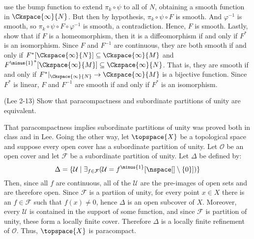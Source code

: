 \documentclass{article}                                                        %
\begin{document}
\begin{solution}
            use the bump function to extend $\pi_{k}\circ\psi$ to all of $N$,
            obtaining a smooth function in $\Ckspace{\infty}{N}$. But then by
            hypothesis, $\pi_{k}\circ\psi\circ{F}$ is smooth. And
            $\varphi^{\minus{1}}$ is smooth, so
            $\pi_{k}\circ\psi\circ{F}\circ\varphi^{\minus{1}}$ is smooth,
            a contradiction. Hence, $F$ is smooth. Lastly, show that if $F$ is a
            homeomorphism, then it is a diffeomorphism if and only if $F^{*}$ is
            an isomorphism. Since $F$ and $F^{\minus{1}}$ are continuous, they
            are both smooth if and only if
            $F^{*}[\Ckspace{\infty}{N}]\subseteq\Ckspace{\infty}{M}$ and
            ${F^{\minus{1}}}^{*}[\Ckspace{\infty}{M}]%
             \subseteq\Ckspace{\infty}{N}$. That is, they are smooth if and only
            if $F^{*}|_{\Ckspace{\infty}{N}}\rightarrow\Ckspace{\infty}{M}$ is a
            bijective function. Since $F^{*}$ is linear, $F$ and $F^{\minus{1}}$
            are smooth if and only if $F^{*}$ is an isomorphism.
        \end{solution}
        \begin{problem}
            (Lee 2-13) Show that paracompactness and subordinate partitions of
            unity are equivalent.
        \end{problem}
        \begin{solution}
            That paracompactness implies subordinate partitions of unity was
            proved both in class and in Lee. Going the other way, let
            $\topspace{X}$ be a topological space and suppose every
            open cover has a subordinate partition of unity. Let $\mathcal{O}$
            be an open cover and let $\mathcal{F}$ be a subordinate partition of
            unity. Let $\Delta$ be defined by:
            \begin{equation}
                \Delta=\{\mathcal{U}\;|\;\exists_{f\in\mathcal{F}}
                (\mathcal{U}=f^{\minus{1}}[\nspace[]\setminus\{0\}])\}
            \end{equation}
            Then, since all $f$ are continuous, all of the $\mathcal{U}$ are the
            pre-images of open sets and are therefore open. Since $\mathcal{F}$
            is a partiion of unity, for every point $x\in{X}$ there is an
            $f\in\mathcal{F}$ such that $f(x)\ne{0}$, hence $\Delta$ is an open
            subcover of $X$. Moreover, every $\mathcal{U}$ is contained in the
            support of some function, and since $\mathcal{F}$ is partition of
            unity, these form a locally finite cover. Therefore $\Delta$ is a
            locally finite refinement of $\mathcal{O}$. Thus, $\topspace{X}$
            is paracompact.
        \end{solution}
\end{document}
